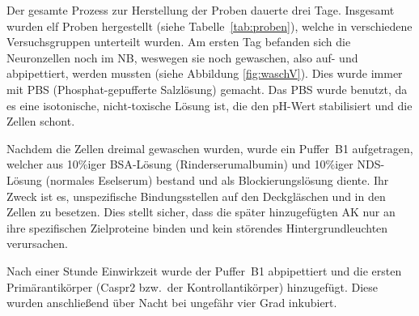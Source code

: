 Der gesamte Prozess zur Herstellung der Proben dauerte drei Tage.
Insgesamt wurden elf Proben hergestellt (siehe Tabelle~\ref{tab:proben}), welche
in verschiedene Versuchsgruppen unterteilt wurden. Am ersten Tag
befanden sich die Neuronzellen noch im NB, weswegen sie noch gewaschen,
also auf- und abpipettiert, werden mussten (siehe Abbildung \ref{fig:waschV}).
Dies wurde immer mit PBS (Phosphat-gepufferte Salzlösung) gemacht. Das
PBS wurde benutzt, da es eine isotonische, nicht-toxische Lösung ist,
die den pH-Wert stabilisiert und die Zellen schont.

Nachdem die Zellen dreimal gewaschen wurden, wurde ein Puffer~B1
aufgetragen, welcher aus 10\%iger BSA-Lösung (Rinderserumalbumin) und
10\%iger NDS-Lösung (normales Eselserum) bestand und als
Blockierungslösung diente. Ihr Zweck ist es, unspezifische
Bindungsstellen auf den Deckgläschen und in den Zellen zu besetzen. Dies
stellt sicher, dass die später hinzugefügten AK nur an ihre spezifischen
Zielproteine binden und kein störendes Hintergrundleuchten verursachen.

Nach einer Stunde Einwirkzeit wurde der Puffer~B1 abpipettiert und die
ersten Primärantikörper (Caspr2 bzw.\ der Kontrollantikörper)
hinzugefügt. Diese wurden anschließend über Nacht bei ungefähr vier Grad
inkubiert.


